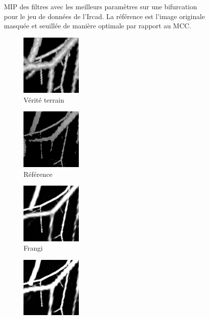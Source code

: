 \begin{figure}[!ht]
      \caption{MIP des filtres avec les meilleurs paramètres sur une bifurcation pour le jeu de données de l'Ircad. La référence est l'image originale masquée et seuillée de manière optimale par rapport au MCC.
      }
      \label{fig:bifurcation_Ircad}
  \end{figure}
  
  \begin{figure}[!ht]
    \centering
    \begin{subfigure}[t]{0.24\textwidth}
      \includegraphics[clip = true, trim  =  170 230 150 240, width=30mm]{Images/Vascu_2_k_GT.png}
      \caption{Vérité terrain}
    \end{subfigure}
    \begin{subfigure}[t]{0.24\textwidth}
      \includegraphics[clip = true, trim  =  170 230 150 240, width=30mm]{Images/Vascu_2_k_Baseline.png}
      \caption{Référence}
    \end{subfigure}
    \begin{subfigure}[t]{0.24\textwidth}
      \includegraphics[clip = true, trim  =  170 230 150 240, width=30mm]{Images/Vascu_2_k_Frangi.png}
      \caption{Frangi}
    \end{subfigure}
    \begin{subfigure}[t]{0.24\textwidth}
      \includegraphics[clip = true, trim  =  170 230 150 240, width=30mm]{Images/Vascu_2_k_Jerman.png}

\end{subfigure}
\end{figure}
